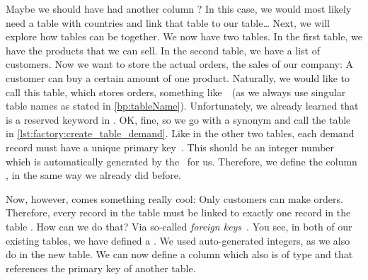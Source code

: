 Maybe we should have had another column ?
In this case, we would most likely need a table with countries and link that table to our  table\dots
Next, we will explore how tables can be  together.%
%
\endhsection%
\FloatBarrier%
\endhsection%
%
\label{sec:factory:demand}%
We now have two tables.
In the first table, we have the products that we can sell.
In the second table, we have a list of customers.
Now we want to store the actual orders, the sales of our company:
A customer can buy a certain amount of one product.%
%
%
%
%
Naturally, we would like to call this table, which stores orders, something like~~(as we always use singular table names as stated in \cref{bp:tableName}).
Unfortunately, we already learned that  is a reserved keyword in \sql.%
%
%
%
OK, fine, so we go with a synonym and call the table~ in \cref{lst:factory:create_table_demand}.
Like in the other two tables, each demand record must have a unique primary key~.
This should be an integer number which is automatically generated by the \db\ for us.
Therefore, we define the column , in the same way we already did before.

Now, however, comes something really cool:
Only customers can make orders.
Therefore, every record in the table  must be linked to exactly one record in the table .
How can we do that?
Via so-called \emph{foreign keys}~\cite{PGDG:PD:FK}.
You see, in both of our existing tables, we have defined a .
We used auto-generated integers, as we also do in the new table.
We can now define a column which also is of type  and that references the primary key of another table.

